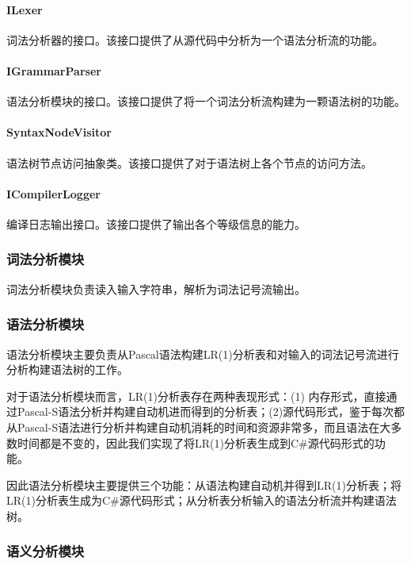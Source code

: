 \documentclass[../main.tex]{subfiles}
\begin{document}
\paragraph{ILexer} 词法分析器的接口。该接口提供了从源代码中分析为一个语法分析流的功能。

\paragraph{IGrammarParser} 语法分析模块的接口。该接口提供了将一个词法分析流构建为一颗语法树的功能。

\paragraph{SyntaxNodeVisitor} 语法树节点访问抽象类。该接口提供了对于语法树上各个节点的访问方法。

\paragraph{ICompilerLogger} 编译日志输出接口。该接口提供了输出各个等级信息的能力。

\subsubsection{词法分析模块}

词法分析模块负责读入输入字符串，解析为词法记号流输出。

\subsubsection{语法分析模块}

语法分析模块主要负责从Pascal语法构建LR(1)分析表和对输入的词法记号流进行分析构建语法树的工作。

对于语法分析模块而言，LR(1)分析表存在两种表现形式：(1) 内存形式，直接通过Pascal-S语法分析并构建自动机进而得到的分析表；(2)源代码形式，鉴于每次都从Pascal-S语法进行分析并构建自动机消耗的时间和资源非常多，而且语法在大多数时间都是不变的，因此我们实现了将LR(1)分析表生成到C\#源代码形式的功能。

因此语法分析模块主要提供三个功能：从语法构建自动机并得到LR(1)分析表；将LR(1)分析表生成为C\#源代码形式；从分析表分析输入的语法分析流并构建语法树。

\subsubsection{语义分析模块}
\end{document}
